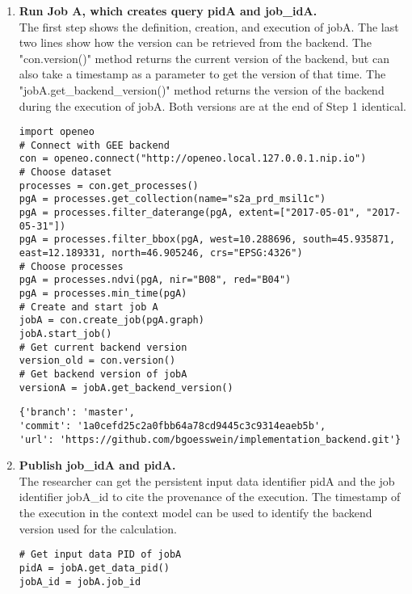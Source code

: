 \documentclass[draft,final]{vutinfth} %
\newenvironment{code}{\captionsetup{type=listing}}{}
\begin{document}
\begin{enumerate}
	\item \textbf{Run Job A, which creates query pidA and job\_idA.} \\
	The first step shows the definition, creation, and execution of jobA. The last two lines show how the version can be retrieved from the backend. The "con.version()" method returns the current version of the backend, but can also take a timestamp as a parameter to get the version of that time. The "jobA.get\_backend\_version()" method returns the version of the backend during the execution of jobA. Both versions are at the end of Step 1 identical. 
	\begin{code}
		\begin{verbatim}
import openeo
# Connect with GEE backend
con = openeo.connect("http://openeo.local.127.0.0.1.nip.io")
# Choose dataset
processes = con.get_processes()
pgA = processes.get_collection(name="s2a_prd_msil1c")
pgA = processes.filter_daterange(pgA, extent=["2017-05-01", "2017-05-31"])
pgA = processes.filter_bbox(pgA, west=10.288696, south=45.935871, 
east=12.189331, north=46.905246, crs="EPSG:4326")
# Choose processes
pgA = processes.ndvi(pgA, nir="B08", red="B04")
pgA = processes.min_time(pgA)
# Create and start job A
jobA = con.create_job(pgA.graph)
jobA.start_job()
# Get current backend version
version_old = con.version()
# Get backend version of jobA 
versionA = jobA.get_backend_version()
		\end{verbatim}
		\caption{Step 1: Researcher runs Job A and gets the used backend version.}
		\label{lst:eva_jobcapture_1}
	\end{code}
	
	\begin{code}
		\begin{verbatim}
{'branch': 'master',
'commit': '1a0cefd25c2a0fbb64a78cd9445c3c9314eaeb5b',
'url': 'https://github.com/bgoesswein/implementation_backend.git'}
		\end{verbatim}
		\caption{Step 1: Version of the jobA execution version\_old.}
		\label{lst:eva_jobcapture_1_1}
	\end{code} 
	
	\item \textbf{Publish job\_idA and pidA.} \\
	The researcher can get the persistent input data identifier pidA and the job identifier jobA\_id to cite the provenance of the execution. The timestamp of the execution in the context model can be used to identify the backend version used for the calculation.
	\begin{code}
		\begin{verbatim}
# Get input data PID of jobA 
pidA = jobA.get_data_pid()
jobA_id = jobA.job_id
		\end{verbatim}
		\caption{Researcher gets the input data PID of jobA and the job\_id of jobA.}
		\label{lst:eva_jobcapture_2}
	\end{code}
	

\end{enumerate}
\end{document}
